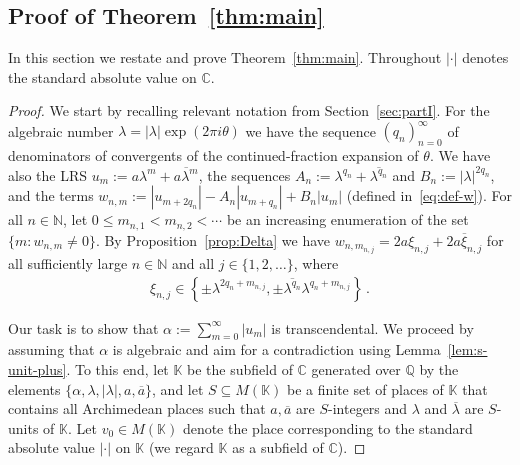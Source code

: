 \documentclass[a4paper,UKenglish,cleveref, autoref, thm-restate]{lipics-v2021}
\begin{document}
\subsection{Proof of Theorem~\ref{thm:main}}
\label{sec:partII}
In this section we restate and prove Theorem~\ref{thm:main}.  Throughout $|\cdot|$ denotes the standard absolute value on $\mathbb C$.
\mainthm*
\begin{proof}
We start by recalling relevant notation from Section~\ref{sec:partI}.  For the
algebraic number $\lambda=|\lambda|\exp(2\pi i \theta)$ we have the sequence $(q_n)_{n=0}^\infty$ of
denominators of convergents of the continued-fraction expansion of
$\theta$.  We have also the
LRS $u_m := a\lambda^m+\overline{a\lambda^m}$, the sequences
$A_n:=\lambda^{q_n}+\overline{\lambda^{q_n}}$ and
$B_n:=|\lambda|^{2q_n}$, and the
terms $w_{n,m}:=|u_{m+2q_n}|-A_n|u_{m+q_n}|+B_n|u_m|$ (defined
in~\eqref{eq:def-w}).  For all $n \in \mathbb N$, let
$0 \leq m_{n,1}< m_{n,2} < \cdots$ be an increasing enumeration of the
set $\{m:w_{n,m}\neq 0\}$.  By Proposition~\ref{prop:Delta} we have $w_{n,m_{n,j}} = 2a\xi_{n,j}+\overline{2a\xi_{n,j}}$ for all sufficiently large $n\in \mathbb N$ and all $j\in \{1,2,\ldots\}$,
where
\begin{gather}
\xi_{n,j} \in \left\{  \pm \lambda^{2q_n+m_{n,j}} , \pm \overline{\lambda^{q_n}}\lambda^{q_n+m_{n,j}} \right\} \, .
    \label{eq:def-xi}
\end{gather}

Our task is to show that
$\alpha := \sum_{m=0}^\infty |u_m|$ is transcendental.  
We proceed by assuming that $\alpha$ is algebraic and aim for a contradiction using Lemma~\ref{lem:s-unit-plus}. 
To this end,
let $\mathbb K$ be the subfield of $\mathbb C$ generated over $\mathbb Q$ by the elements $\{\alpha,\lambda, |\lambda|, a, \overline{a}\}$,  
and let $S \subseteq M(\mathbb K)$  be a finite set of places of $\mathbb K$ that contains all Archimedean places 
such that $a,\overline{a}$ are $S$-integers and  $\lambda$ and $\overline{\lambda}$ are $S$-units of $\mathbb K$.
Let $v_0 \in M(\mathbb K)$ denote the place corresponding 
to the standard absolute value $|\cdot|$ on $\mathbb K$ (we regard $\mathbb K$ as a subfield of $\mathbb C$).


\end{proof}
\end{document}
